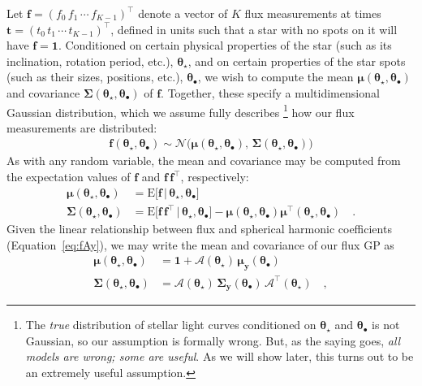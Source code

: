 \documentclass[modern]{aastex62}
\begin{document}
Let
$\mathbf{f} = \left( f_0 \, f_1 \, \cdots \,  f_{K-1} \right)^\top$
denote a vector of $K$ flux measurements at times
$\mathbf{t} = \left( t_0 \,  t_1 \,  \cdots \, t_{K-1} \right)^\top$,
defined in units such that a star with no spots on it will have
$\mathbf{f} = \mathbf{1}$.
Conditioned on certain physical properties of the
star
(such as its inclination, rotation period, etc.), $\pmb{\theta}_\star$,
and on certain properties of the  star spots
(such as their sizes, positions, etc.), $\pmb{\theta}_\bullet$,
we wish to compute the mean $\pmb{\mu}(\pmb{\theta}_\star, \pmb{\theta}_\bullet)$ and
covariance $\pmb{\Sigma}(\pmb{\theta}_\star, \pmb{\theta}_\bullet)$
of $\mathbf{f}$. Together, these specify a multidimensional Gaussian
distribution, which we assume fully describes%
\footnote{The \emph{true} distribution of stellar light curves conditioned
    on $\pmb{\theta}_\star$ and $\pmb{\theta}_\bullet$ is not Gaussian, so our
    assumption is formally wrong. But, as the saying goes, \emph{all models are
        wrong; some are useful}. As we will show later, this turns out to be
    an extremely useful assumption.}
how our flux measurements
are distributed:
%
\begin{align}
    \mathbf{f}\left(\pmb{\theta}_\star, \pmb{\theta}_\bullet\right) \sim
    \mathcal{N}\Big(
    \pmb{\mu}\left(\pmb{\theta}_\star, \pmb{\theta}_\bullet\right),
    \,
    \pmb{\Sigma}\left(\pmb{\theta}_\star, \pmb{\theta}_\bullet\right)
    \Big)
\end{align}
%
As with any random variable, the mean and covariance may be computed from
the expectation values of $\mathbf{f}$ and
$\mathbf{f}\,\mathbf{f}^\top$, respectively:
%
\begin{align}
    \label{eq:mean}
    \pmb{\mu}(\pmb{\theta}_\star, \pmb{\theta}_\bullet)
     & = \mathrm{E} \Big[ \mathbf{f} \, \Big| \, \pmb{\theta}_\star, \pmb{\theta}_\bullet \Big]
    \\
    \label{eq:cov}
    \pmb{\Sigma}(\pmb{\theta}_\star, \pmb{\theta}_\bullet)
     & = \mathrm{E} \Big[ \mathbf{f} \, \mathbf{f}^\top \, \Big| \, \pmb{\theta}_\star, \pmb{\theta}_\bullet \Big] - \pmb{\mu}(\pmb{\theta}_\star, \pmb{\theta}_\bullet) \pmb{\mu}^\top(\pmb{\theta}_\star, \pmb{\theta}_\bullet)
    \quad.
\end{align}
%
Given the linear relationship between flux and spherical harmonic
coefficients (Equation~\ref{eq:fAy}),
we may write the mean and covariance of our flux GP as
%
\begin{align}
    \label{eq:mean_f}
    \pmb{\mu}(\pmb{\theta}_\star, \pmb{\theta}_\bullet)
     & = \mathbf{1} + \pmb{\mathcal{A}}(\pmb{\theta}_\star) \, \pmb{\mu}_{\mathbf{y}}(\pmb{\theta}_\bullet)
    \\
    \label{eq:cov_f}
    \pmb{\Sigma}(\pmb{\theta}_\star, \pmb{\theta}_\bullet)
     & = \pmb{\mathcal{A}}(\pmb{\theta}_\star) \, \pmb{\Sigma}_{\mathbf{y}}(\pmb{\theta}_\bullet) \, \pmb{\mathcal{A}}^\top(\pmb{\theta}_\star)
    \quad,
\end{align}
\end{document}
